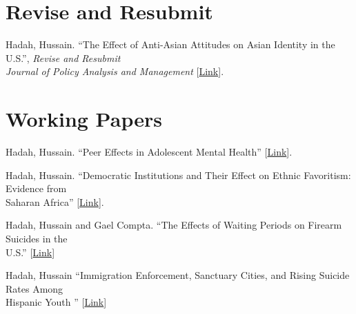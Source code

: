\documentclass[letterpaper]{article}
\renewenvironment{itemize}{
  \begin{list}{}{
    \setlength{\leftmargin}{1.5em}
  }
}{
  \end{list}
}
\begin{document}
\section*{Revise and Resubmit}
\vspace{2 mm}
\begin{itemize}
  \item Hadah, Hussain. ``The Effect of Anti-Asian Attitudes on Asian Identity in the U.S.'', \textit{Revise and Resubmit} \\{\makebox[4mm]{\hfill}} \textit{Journal of Policy Analysis and Management} [\href{https://hhadah.github.io/asian-identity-attrition/my_paper/submit_preprint.pdf}{Link}]. 
\end{itemize}
\vspace{2 mm}
\section*{Working Papers}
\vspace{2 mm}
\begin{itemize}
  \item Hadah, Hussain. ``Peer Effects in Adolescent Mental Health'' [\href{https://hhadah.github.io/Depression_Idea/my_paper/Hadah-Peer-Effect-Depression.pdf}{Link}].
  \item Hadah, Hussain. ``Democratic Institutions and Their Effect on Ethnic Favoritism: Evidence from \\{\makebox[4mm]{\hfill}} Saharan Africa'' [\href{https://dx.doi.org/10.2139/ssrn.4566225}{Link}].
  \item Hadah, Hussain and Gael Compta\student. ``The Effects of Waiting Periods on Firearm Suicides in the \\{\makebox[4mm]{\hfill}} U.S.'' [\href{https://dx.doi.org/10.2139/ssrn.5383500}{Link}]
\studentnote
  \item Hadah, Hussain ``Immigration Enforcement, Sanctuary Cities, and Rising Suicide Rates Among\\{\makebox[4mm]{\hfill}}Hispanic Youth '' [\href{https://hhadah.github.io/sc-and-hispanic-children-suicide/my_paper/sc_and_hispanic_children_suicide.pdf}{Link}]
\end{itemize}
\vspace{2 mm}
\end{document}
